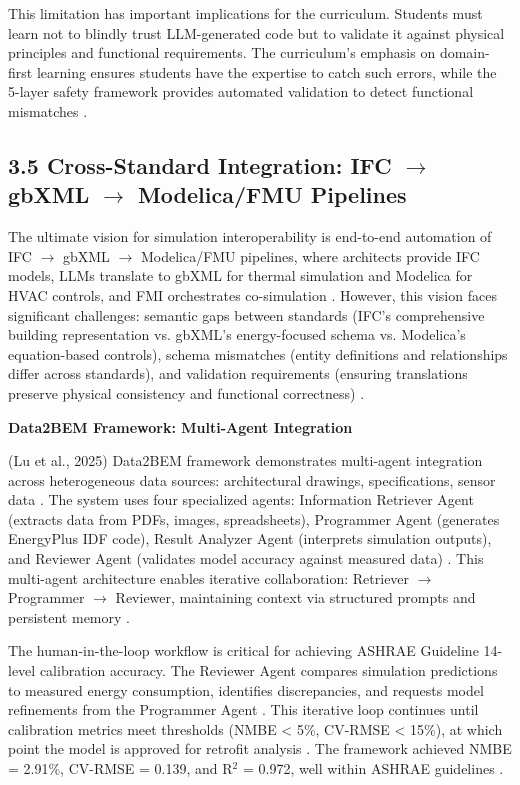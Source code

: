 \documentclass[12pt,a4paper]{article}
\begin{document}
This limitation has important implications for the curriculum. Students must learn not to blindly trust LLM-generated code but to validate it against physical principles and functional requirements. The curriculum's emphasis on domain-first learning ensures students have the expertise to catch such errors, while the 5-layer safety framework provides automated validation to detect functional mismatches \cite{ref104}.

\subsection{3.5 Cross-Standard Integration: IFC $\rightarrow$ gbXML $\rightarrow$ Modelica/FMU Pipelines}

The ultimate vision for simulation interoperability is end-to-end automation of IFC $\rightarrow$ gbXML $\rightarrow$ Modelica/FMU pipelines, where architects provide IFC models, LLMs translate to gbXML for thermal simulation and Modelica for HVAC controls, and FMI orchestrates co-simulation \cite{ref105}. However, this vision faces significant challenges: semantic gaps between standards (IFC's comprehensive building representation vs. gbXML's energy-focused schema vs. Modelica's equation-based controls), schema mismatches (entity definitions and relationships differ across standards), and validation requirements (ensuring translations preserve physical consistency and functional correctness) \cite{ref106}.

\textbf{Data2BEM Framework: Multi-Agent Integration}

(Lu et al., 2025) Data2BEM framework demonstrates multi-agent integration across heterogeneous data sources: architectural drawings, specifications, sensor data \cite{ref107}. The system uses four specialized agents: Information Retriever Agent (extracts data from PDFs, images, spreadsheets), Programmer Agent (generates EnergyPlus IDF code), Result Analyzer Agent (interprets simulation outputs), and Reviewer Agent (validates model accuracy against measured data) \cite{ref108}. This multi-agent architecture enables iterative collaboration: Retriever $\rightarrow$ Programmer $\rightarrow$ Reviewer, maintaining context via structured prompts and persistent memory \cite{ref109}.

The human-in-the-loop workflow is critical for achieving ASHRAE Guideline 14-level calibration accuracy. The Reviewer Agent compares simulation predictions to measured energy consumption, identifies discrepancies, and requests model refinements from the Programmer Agent \cite{ref110}. This iterative loop continues until calibration metrics meet thresholds (NMBE < 5\%, CV-RMSE < 15\%), at which point the model is approved for retrofit analysis \cite{ref111}. The framework achieved NMBE = 2.91\%, CV-RMSE = 0.139, and R$^2$ = 0.972, well within ASHRAE guidelines \cite{ref112}.
\end{document}
